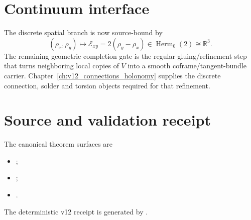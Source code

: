 \section{Continuum interface}

The discrete spatial branch is now source-bound by
\[
\boxed{
(\rho_x,\rho_y)
\longmapsto
\mathcal E_{xy}=2(\rho_y-\rho_x)
\in\operatorname{Herm}_0(2)\cong\mathbb R^3.
}
\]
The remaining geometric completion gate is the regular gluing/refinement step
that turns neighboring local copies of \(V\) into a smooth coframe/tangent-bundle
carrier.  Chapter~\ref{ch:v12_connections_holonomy} supplies the discrete
connection, solder and torsion objects required for that refinement.

\section{Source and validation receipt}

The canonical theorem surfaces are
\begin{itemize}
\item {};
\item {};
\item {}.
\end{itemize}

The deterministic v12 receipt is generated by
.
